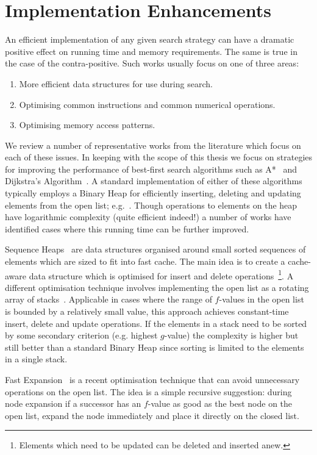 \section{Implementation Enhancements}
\label{cha::lit::impl}
An efficient implementation of any given search strategy can have a dramatic positive effect on
running time and memory requirements. The same is true in the case of the contra-positive.  
Such works usually focus on one of three areas:
\begin{enumerate}
\item More efficient data structures for use during search.
\item Optimising common instructions and common numerical operations.
\item Optimising memory access patterns.
\end{enumerate}
We review a number of representative works from the literature which focus on each of these
issues. In keeping with the scope of this thesis we focus on strategies for improving
the performance of best-first search algorithms such as A*~\citep{hart68} and 
Dijkstra's Algorithm~\citep{dijkstra59}. A standard implementation of either of these algorithms
typically employs a Binary Heap for efficiently inserting, deleting and updating elements from 
the open list; e.g.~\citep{stout96,botea04}.  
Though operations to elements on the heap have logarithmic complexity (quite efficient indeed!) 
a number of works have identified cases where this running time can be further improved. 

Sequence Heaps~\citep{sanders99} are data structures organised around small sorted sequences of
elements which are sized to fit into fast cache. The main idea is to create a cache-aware data
structure which is optimised for insert and delete operations~\footnote{Elements which need to be
updated can be deleted and inserted anew.}. A different optimisation technique involves implementing
the open list as a rotating array of stacks~\citep{Cazenave:06}. Applicable in cases where the
range of $f$-values in the open list is bounded by a relatively small value, this approach achieves
constant-time insert, delete and update operations. If the elements in a stack need to be sorted by
some secondary criterion (e.g. highest $g$-value) the complexity is higher but still better than a
standard Binary Heap since sorting is limited to the elements in a single stack.

Fast Expansion~\citep{sun09} is a recent optimisation technique that can avoid unnecessary 
operations on the open list. The idea is a simple recursive suggestion: during node expansion 
if a successor has an $f$-value as good as the best node on the open list, expand the node 
immediately and place it directly on the closed list. 

